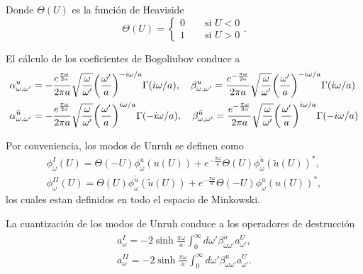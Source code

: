 Donde $\Theta(U)$ es la función de Heaviside 
\begin{equation}
   \Theta(U)=
  \begin{cases}
    0\qquad \text{si }U<0 \\
    1\qquad \text{si }U>0
  \end{cases}
  .
\end{equation}

El cálculo de los coeficientes de Bogoliubov conduce a 
\begin{equation}
  \begin{aligned}
    &\alpha_{\omega,\omega'}^{ u} = -\frac{e^{\frac{\pi\omega}{2 a}}}{2\pi a}\sqrt{\frac{\omega}{\omega'}}\qty(\frac{\omega'}{a})^{-i\omega/a}
    \Gamma(i\omega/a), \quad
    \beta_{\omega,\omega'}^{ u} = \frac{e^{-\frac{\pi\omega}{2 a}}}{2\pi a}\sqrt{\frac{\omega}{\omega'}}\qty(\frac{\omega'}{a})^{-i\omega/a}
    \Gamma(i\omega/a)\\
    &\alpha_{\omega,\omega'}^{\tilde u} = -\frac{e^{\frac{\pi\omega}{2 a}}}{2\pi a}\sqrt{\frac{\omega}{\omega'}}\qty(\frac{\omega'}{a})^{i\omega/a}
    \Gamma(-i\omega/a), \quad
    \beta_{\omega,\omega'}^{\tilde u} = \frac{e^{-\frac{\pi\omega}{2 a}}}{2\pi a}\sqrt{\frac{\omega}{\omega'}}\qty(\frac{\omega'}{a})^{i\omega/a} 
    \Gamma(-i\omega/a)
  \end{aligned}
\end{equation}

Por conveniencia, los modos de Unruh se definen como
\begin{equation}
  \begin{aligned}
    \phi^I_\omega(U)=\Theta(-U)\phi^u_\omega(u(U)) + e^{-\frac{\pi\omega}{a}}\Theta(U)\phi_\omega^{\tilde u}(\tilde u(U))^*,\\
    \phi^{II}_\omega(U)=\Theta(U)\phi^{\tilde u}_\omega(\tilde u(U)) + e^{-\frac{\pi\omega}{a}}\Theta(-U)\phi_\omega^{u}(u(U))^*,
  \end{aligned}
\end{equation}
los cuales estan definidos en todo el espacio de Minkowski.

La cuantización de los modos de Unruh conduce a los operadores de destrucción
\begin{equation}
  \begin{aligned}
    a_\omega^I = -2\sinh\frac{\pi\omega}{a}\int_0^\infty d\omega' \beta_{\omega\omega'}^{\tilde u} a_{\omega'}^U,\\
    a_\omega^{II} = -2\sinh\frac{\pi\omega}{a}\int_0^\infty d\omega' \beta_{\omega\omega'}^{u} a_{\omega'}^U.\\
  \end{aligned}
\end{equation}

